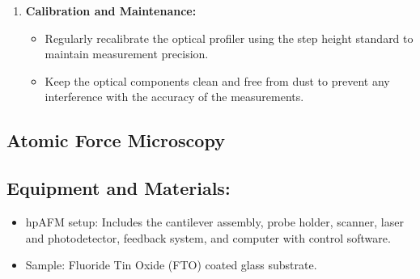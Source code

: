 \documentclass[11pt]{article}
\begin{document}
\begin{enumerate}
			\item \textbf{Calibration and Maintenance:}
			\begin{itemize}
				\item Regularly recalibrate the optical profiler using the step height standard to maintain measurement precision.
				\item Keep the optical components clean and free from dust to prevent any interference with the accuracy of the measurements.
			\end{itemize}
		\end{enumerate}
	
	
\clearpage
	
	\subsection{Atomic Force Microscopy}
	
		\subsection*{Equipment and Materials:}
		\begin{itemize}
			\item hpAFM setup: Includes the cantilever assembly, probe holder, scanner, laser and photodetector, feedback system, and computer with control software.
			\item Sample: Fluoride Tin Oxide (FTO) coated glass substrate.
		\end{itemize}
		
\end{document}
